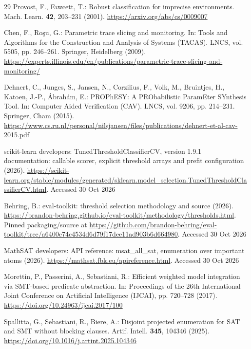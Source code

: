 \documentclass[11pt,a4paper]{article}
\begin{document}
\begin{thebibliography}{29}
Provost, F., Fawcett, T.: Robust classification for imprecise environments. Mach. Learn. \textbf{42}, 203--231 (2001). \url{https://arxiv.org/abs/cs/0009007}

Chen, F., Ro\c{s}u, G.: Parametric trace slicing and monitoring. In: Tools and Algorithms for the Construction and Analysis of Systems (TACAS). LNCS, vol. 5505, pp. 246--261. Springer, Heidelberg (2009). \url{https://experts.illinois.edu/en/publications/parametric-trace-slicing-and-monitoring/}

Dehnert, C., Junges, S., Jansen, N., Corzilius, F., Volk, M., Bruintjes, H., Katoen, J.-P., \'{A}brah\'{a}m, E.: PROPhESY: A PRObabilistic ParamEter SYnthesis Tool. In: Computer Aided Verification (CAV). LNCS, vol. 9206, pp. 214--231. Springer, Cham (2015). \url{https://www.cs.ru.nl/personal/nilsjansen/files/publications/dehnert-et-al-cav-2015.pdf}

scikit-learn developers: TunedThresholdClassifierCV, version 1.9.1 documentation: callable scorer, explicit threshold arrays and prefit configuration (2026). \url{https://scikit-learn.org/stable/modules/generated/sklearn.model_selection.TunedThresholdClassifierCV.html}. Accessed 30 Oct 2026

Behring, B.: eval-toolkit: threshold selection methodology and source (2026). \url{https://brandon-behring.github.io/eval-toolkit/methodology/thresholds.html}. Pinned packaging/source at \url{https://github.com/brandon-behring/eval-toolkit/tree/a6400e74c4534d6d79f17dee11ad903b6d664980}. Accessed 30 Oct 2026

MathSAT developers: API reference: msat\_all\_sat, enumeration over important atoms (2026). \url{https://mathsat.fbk.eu/apireference.html}. Accessed 30 Oct 2026

Morettin, P., Passerini, A., Sebastiani, R.: Efficient weighted model integration via SMT-based predicate abstraction. In: Proceedings of the 26th International Joint Conference on Artificial Intelligence (IJCAI), pp. 720--728 (2017). \url{https://doi.org/10.24963/ijcai.2017/100}

Spallitta, G., Sebastiani, R., Biere, A.: Disjoint projected enumeration for SAT and SMT without blocking clauses. Artif. Intell. \textbf{345}, 104346 (2025). \url{https://doi.org/10.1016/j.artint.2025.104346}


\end{thebibliography}
\end{document}
